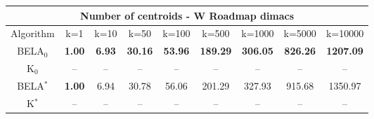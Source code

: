 \begin{tabular}{c|cccccccc}\toprule
\multicolumn{9}{c}{Number of centroids - W Roadmap dimacs}\\ \midrule
Algorithm & k=1 & k=10 & k=50 & k=100 & k=500 & k=1000 & k=5000 & k=10000 \\ \midrule
BELA$_0$ & \textbf{1.00} & \textbf{6.93} & \textbf{30.16} & \textbf{53.96} & \textbf{189.29} & \textbf{306.05} & \textbf{826.26} & \textbf{1207.09} \\
K$_0$ & -- & -- & -- & -- & -- & -- & -- & -- \\
BELA$^*$ & \textbf{1.00} & 6.94 & 30.78 & 56.06 & 201.29 & 327.93 & 915.68 & 1350.97 \\
K$^*$ & -- & -- & -- & -- & -- & -- & -- & -- \\ \bottomrule 
\end{tabular}
